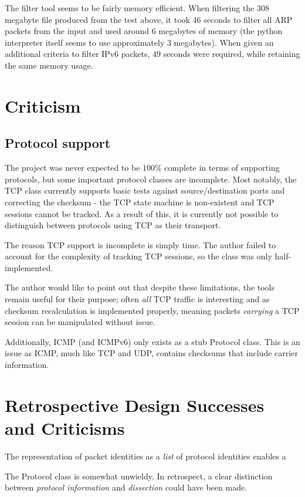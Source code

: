 \documentclass[10pt,a4paper,notitlepage]{report}
\begin{document}
The filter tool seems to be fairly memory efficient. When filtering the 308 megabyte file produced from the test above, it took 46 seconds to filter all ARP packets from the input and used around 6 megabytes of memory (the python interpreter itself seems to use approximately 3 megabytes). When given an additional criteria to filter IPv6 packets, 49 seconds were required, while retaining the same memory usage.

\section{Criticism}
\subsection{Protocol support}
The project was never expected to be $100\%$ complete in terms of supporting protocols, but some important protocol classes are incomplete. Most notably, the TCP class currently supports basic tests against source/destination ports and correcting the checksum - the TCP state machine is non-existent and TCP sessions cannot be tracked. As a result of this, it is currently not possible to distinguish between protocols using TCP as their transport.

The reason TCP support is incomplete is simply time. The author failed to account for the complexity of tracking TCP sessions, so the class was only half-implemented.

The author would like to point out that despite these limitations, the tools remain useful for their purpose; often \emph{all} TCP traffic is interesting and as checksum recalculation is implemented properly, meaning packets \emph{carrying} a TCP session can be manipulated without issue.

Additionally, ICMP (and ICMPv6) only exists as a stub Protocol class. This is an issue as ICMP, much like TCP and UDP, contains checksums that include carrier information.

\section{Retrospective Design Successes and Criticisms}
The representation of packet identities as a \emph{list} of protocol identities enables a

The Protocol class is somewhat unwieldy. In retrospect, a clear distinction between \emph{protocol information} and \emph{dissection} could have been made.
\end{document}
